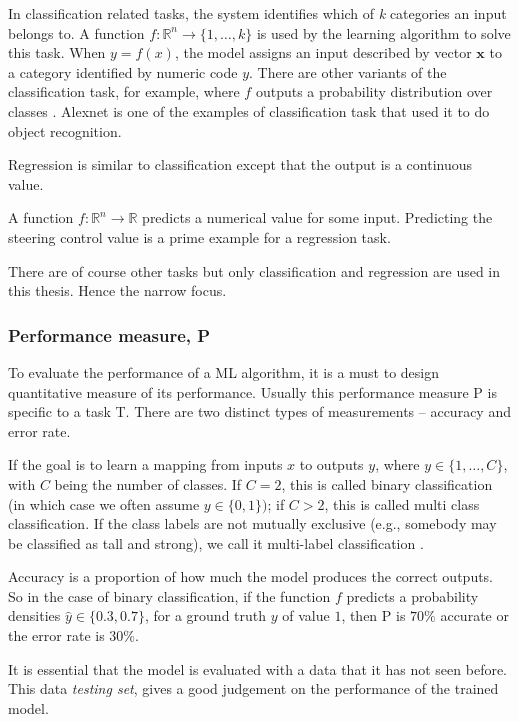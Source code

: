 In classification related tasks, the system identifies which of \textit{k} categories an
input belongs to. A function $f : \mathbb{R}^n \rightarrow\{1, \ldots,k\}$ is used by the
learning algorithm to solve this task. When $y = f(x)$, the model assigns an input
described by vector $\mathbf{x}$ to a category
identified by numeric code $y$. There are other variants of the classification
task, for example, where $f$ outputs a probability distribution over classes
\cite{Goodfellow-et-al-2016_1}. Alexnet \cite{Alexnet2012} is one of the examples of
classification task that used it to do object recognition.

Regression is similar to classification except that the output is a continuous value.

A function $f: \mathbb{R}^n \rightarrow \mathbb{R}$ predicts a numerical value for some input.
Predicting the steering control value is a prime example for a regression task.

There are of course other tasks but only classification and regression are used in this
thesis. Hence the narrow focus.

\subsubsection*{Performance measure, P}
To evaluate the performance of a ML algorithm, it is a must to design quantitative measure
of its performance. Usually this performance measure P is specific to a task T. There
are two distinct types of measurements -- accuracy and error rate.

If the goal is to learn a mapping from inputs $x$ to outputs $y$, where $y \in \{1,\ldots
, C\}$, with $C$ being the number of classes. If $C = 2$, this is
called binary classification (in which case we often assume $y \in \{0, 1\})$; if $C > 2$, this is called
multi class classification. If the class labels are not mutually exclusive (e.g., somebody may be
classified as tall and strong), we call it multi-label classification
\cite{murphy2013machine_1}.

Accuracy is a proportion of how much the model produces the correct outputs.
So in the case of binary classification, if the function $f$ predicts a probability
densities $\hat y \in \{0.3, 0.7\}$, for a ground truth $y$ of value $1$, then P is $70\%$
accurate or the error rate is $30\%$.

It is essential that the model is evaluated with a data that it has not seen before. This data
\textit{testing set}, gives a good judgement on the performance  of the trained model.

